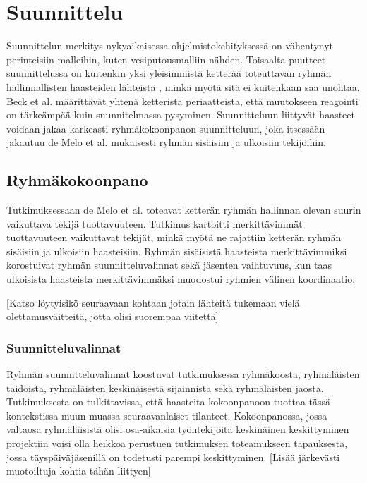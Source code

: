 \chapter{Suunnittelu}

Suunnittelun merkitys nykyaikaisessa ohjelmistokehityksessä on vähentynyt perinteisiin malleihin, kuten vesiputousmalliin nähden. Toisaalta puutteet suunnittelussa on kuitenkin yksi yleisimmistä ketterää toteuttavan ryhmän hallinnallisten haasteiden lähteistä \cite{7872736}, minkä myötä sitä ei kuitenkaan saa unohtaa. Beck et al. \cite{beck2001agile} määrittävät yhtenä ketteristä periaatteista, että muutokseen reagointi on tärkeämpää kuin suunnitelmassa pysyminen. Suunnitteluun liittyvät haasteet voidaan jakaa karkeasti ryhmäkokoonpanon suunnitteluun, joka itsessään jakautuu de Melo et al. \cite{DEOMELO2013412} mukaisesti ryhmän sisäisiin ja ulkoisiin tekijöihin.

\section{Ryhmäkokoonpano}

Tutkimuksessaan de Melo et al. \cite{DEOMELO2013412} toteavat ketterän ryhmän hallinnan olevan suurin vaikuttava tekijä tuottavuuteen. Tutkimus kartoitti merkittävimmät tuottavuuteen vaikuttavat tekijät, minkä myötä ne rajattiin ketterän ryhmän sisäisiin ja ulkoisiin haasteisiin. Ryhmän sisäisistä haasteista merkittävimmiksi korostuivat ryhmän suunnitteluvalinnat sekä jäsenten vaihtuvuus, kun taas ulkoisista haasteista merkittävimmäksi muodostui ryhmien välinen koordinaatio.

[Katso löytyisikö seuraavaan kohtaan jotain lähteitä tukemaan vielä olettamusväitteitä, jotta olisi suorempaa viitettä]

\subsection{Suunnitteluvalinnat}

Ryhmän suunnitteluvalinnat koostuvat \cite{DEOMELO2013412} tutkimuksessa ryhmäkoosta, ryhmäläisten taidoista, ryhmäläisten keskinäisestä sijainnista sekä ryhmäläisten jaosta. Tutkimuksesta on tulkittavissa, että haasteita kokoonpanoon tuottaa tässä kontekstissa muun muassa seuraavanlaiset tilanteet. Kokoonpanossa, jossa valtaosa ryhmäläisistä olisi osa-aikaisia työntekijöitä keskinäinen keskittyminen projektiin voisi olla heikkoa perustuen tutkimuksen toteamukseen tapauksesta, jossa täyspäiväjäsenillä on todetusti parempi keskittyminen. [Lisää järkevästi muotoiltuja kohtia tähän liittyen]

